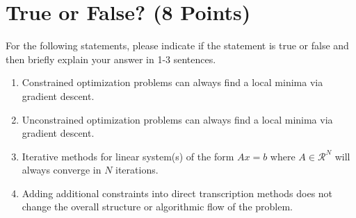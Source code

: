 \documentclass[]{article}
\begin{document}
\bigskip



\newpage


\section{True or False? (8 Points)}
For the following statements, please indicate if the statement is true or false and then briefly explain your answer in 1-3 sentences.
\begin{tcolorbox}[left=14pt, arc=0pt, outer arc=0pt, colframe=blue!5, colback=blue!5]
\begin{enumerate}[label=(\alph*)]
    \item Constrained optimization problems can always find a local minima via gradient descent.
    \item Unconstrained optimization problems can always find a local minima via gradient descent.
    \item Iterative methods for linear system(s) of the form $Ax=b$ where $A\in \mathcal{R}^N$ will always converge in $N$ iterations.
    \item Adding additional constraints into direct transcription methods does not change the overall structure or
    algorithmic flow of the problem.
\end{enumerate}
\end{tcolorbox}


\end{document}
